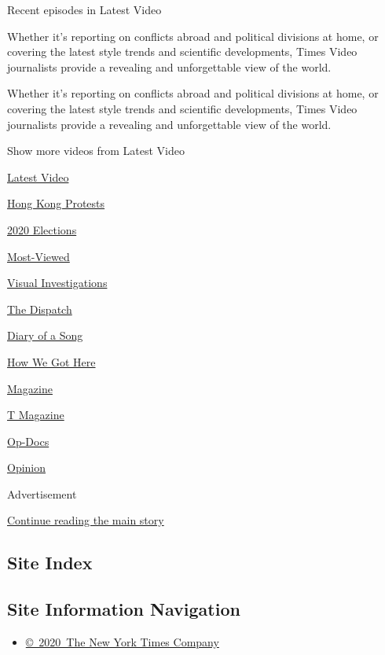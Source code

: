 Recent episodes in Latest Video

Whether it's reporting on conflicts abroad and political divisions at
home, or covering the latest style trends and scientific developments,
Times Video journalists provide a revealing and unforgettable view of
the world.

Whether it's reporting on conflicts abroad and political divisions at
home, or covering the latest style trends and scientific developments,
Times Video journalists provide a revealing and unforgettable view of
the world.

Show more videos from Latest Video

\href{/video}{}

\href{/video/latest-video}{Latest Video}

\href{/video/hk-protest}{Hong Kong Protests}

\href{/video/2020-Elections}{2020 Elections}

\href{/video/Most-Viewed}{Most-Viewed}

\href{/video/investigations}{Visual Investigations}

\href{/video/on-the-ground}{The Dispatch}

\href{/video/diaryofasong}{Diary of a Song}

\href{/video/how-we-got-here}{How We Got Here}

\href{/video/magazine}{Magazine}

\href{/video/t-magazine}{T Magazine}

\href{/video/op-docs}{Op-Docs}

\href{/video/opinion}{Opinion}

Advertisement

\protect\hyperlink{after-bottom}{Continue reading the main story}

\hypertarget{site-index}{%
\subsection{Site Index}\label{site-index}}

\hypertarget{site-information-navigation}{%
\subsection{Site Information
Navigation}\label{site-information-navigation}}

\begin{itemize}
\tightlist
\item
  \href{https://help.nytimes3xbfgragh.onion/hc/en-us/articles/115014792127-Copyright-notice}{©~2020~The
  New York Times Company}
\end{itemize}

